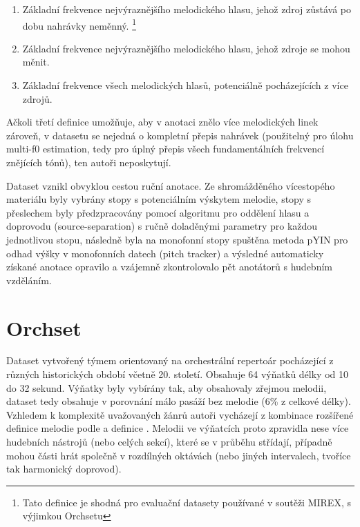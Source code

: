 \begin{enumerate}
    \item Základní frekvence nejvýraznějšího melodického hlasu, jehož zdroj zůstává po dobu nahrávky neměnný. \footnote{Tato definice je shodná pro evaluační datasety používané v soutěži MIREX, s výjimkou Orchsetu}
    \item Základní frekvence nejvýraznějšího melodického hlasu, jehož zdroje se mohou měnit.
    \item Základní frekvence všech melodických hlasů, potenciálně pocházejících z více zdrojů.
\end{enumerate}

Ačkoli třetí definice umožňuje, aby v anotaci znělo více melodických linek zároveň, v datasetu se nejedná o kompletní přepis nahrávek (použitelný pro úlohu multi-f0 estimation, tedy pro úplný přepis všech fundamentálních frekvencí znějících tónů), ten autoři neposkytují.

Dataset vznikl obvyklou cestou ruční anotace. Ze shromážděného vícestopého materiálu byly vybrány stopy s potenciálním výskytem melodie, stopy s přeslechem byly předzpracovány pomocí algoritmu pro oddělení hlasu a doprovodu (source-separation) s ručně doladěnými parametry pro každou jednotlivou stopu, následně byla na monofonní stopy spuštěna metoda pYIN pro odhad výšky v monofonních datech (pitch tracker) a výsledné automaticky získané anotace opravilo a vzájemně zkontrolovalo pět anotátorů s hudebním vzděláním. 

\section{Orchset}

Dataset vytvořený týmem \cite{Bosch2016} orientovaný na orchestrální repertoár pocházející z různých historických období včetně 20. století. Obsahuje 64 výňatků délky od 10 do 32 sekund. Výňatky byly vybírány tak, aby obsahovaly zřejmou melodii, dataset tedy obsahuje v porovnání málo pasáží bez melodie (6\% z celkové délky). Vzhledem k komplexitě uvažovaných žánrů autoři vycházejí z kombinace rozšířené definice melodie podle \cite{Bittner2014} a definice \cite{Poliner2007}. Melodii ve výňatcích proto zpravidla nese více hudebních nástrojů (nebo celých sekcí), které se v průběhu střídají, případně mohou části hrát společně v rozdílných oktávách (nebo jiných intervalech, tvoříce tak harmonický doprovod). 

